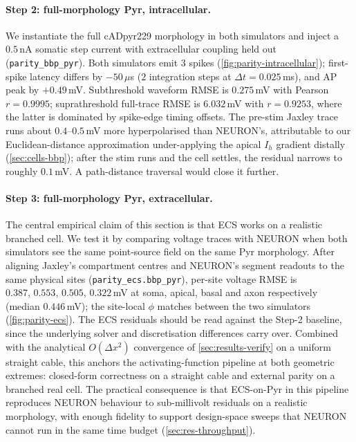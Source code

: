 \paragraph{Step 2: full-morphology Pyr, intracellular.} We instantiate
the full cADpyr229 morphology in both simulators and inject a
$0.5\,$nA somatic step current with extracellular coupling held out
(\texttt{parity\_bbp\_pyr}). Both simulators emit $3$ spikes
(\cref{fig:parity-intracellular}); first-spike latency differs by
$-50\,\mu$s ($2$ integration steps at $\Delta t = 0.025\,$ms), and AP
peak by $+0.49\,$mV. Subthreshold
waveform RMSE is $0.275\,$mV with Pearson $r = 0.9995$;
suprathreshold full-trace RMSE is $6.032\,$mV with $r = 0.9253$, where
the latter is dominated by spike-edge timing offsets. The pre-stim Jaxley
trace runs about $0.4\text{--}0.5\,$mV more hyperpolarised than NEURON's,
attributable to our Euclidean-distance approximation under-applying
the apical $I_h$ gradient distally (\cref{sec:cells-bbp}); after the
stim runs and the cell settles, the residual narrows to roughly
$0.1\,$mV. A path-distance traversal would close it further.

\paragraph{Step 3: full-morphology Pyr, extracellular.} The central
empirical claim of this section is that ECS works on a realistic
branched cell.
We test it by comparing voltage traces with NEURON when both
simulators see the same point-source field on the same Pyr
morphology. After aligning Jaxley's compartment centres and NEURON's
segment readouts to the same physical sites
(\texttt{parity\_ecs.bbp\_pyr}), per-site voltage RMSE is
$0.387,\,0.553,\,0.505,\,0.322\,$mV at soma, apical, basal and axon
respectively (median $0.446\,$mV); the site-local $\phi$ matches
between the two simulators (\cref{fig:parity-ecs}). The ECS residuals should be read against
the Step-2 baseline, since the underlying solver and discretisation
differences carry over. Combined with the analytical
$O(\Delta x^2)$ convergence of \cref{sec:results-verify} on a uniform
straight cable, this anchors the activating-function pipeline at both
geometric extremes: closed-form correctness on a straight cable and
external parity on a branched real cell. The practical consequence is
that ECS-on-Pyr in this pipeline reproduces NEURON behaviour to
sub-millivolt residuals on a realistic morphology, with enough
fidelity to support design-space sweeps that NEURON cannot run in the
same time budget (\cref{sec:res-throughput}).

